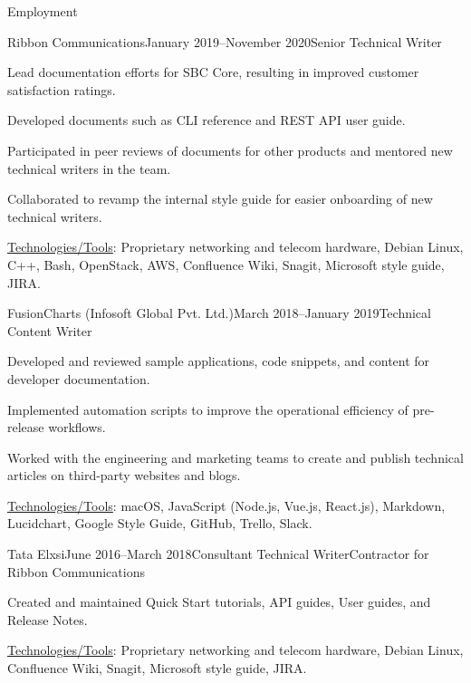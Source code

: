 \documentclass{resume} %
\begin{document}
\begin{rSection}{Employment}
\vspace{1cm}

\begin{rSubsection}{Ribbon Communications}{January 2019–November 2020}{Senior Technical Writer}{}
\item Lead documentation efforts for SBC Core, resulting in improved customer satisfaction ratings.
\item Developed documents such as CLI reference and REST API user guide.
\item Participated in peer reviews of documents for other products and mentored new technical writers in the team.
\item Collaborated to revamp the internal style guide for easier onboarding of new technical writers.
\item \underline{Technologies/Tools}: Proprietary networking and telecom hardware, Debian Linux, C++, Bash, OpenStack, AWS, Confluence Wiki, Snagit, Microsoft style guide, JIRA.
\end{rSubsection}


\begin{rSubsection}{FusionCharts (Infosoft Global Pvt. Ltd.)}{March 2018–January 2019}{Technical Content Writer}{}
\item Developed and reviewed sample applications, code snippets, and content for developer documentation.
\item Implemented automation scripts to improve the operational efficiency of pre-release workflows.
\item Worked with the engineering and marketing teams to create and publish technical articles on third-party websites and blogs.
\item \underline{Technologies/Tools}: macOS, JavaScript (Node.js, Vue.js, React.js), Markdown, Lucidchart, Google Style Guide, GitHub, Trello, Slack.
\end{rSubsection}


\begin{rSubsection}{Tata Elxsi}{June 2016–March 2018}{Consultant Technical Writer}{Contractor for Ribbon Communications}
\item Created and maintained Quick Start tutorials, API guides, User guides, and Release Notes.
\item \underline{Technologies/Tools}: Proprietary networking and telecom hardware, Debian Linux, Confluence Wiki, Snagit, Microsoft style guide, JIRA.
\end{rSubsection}


\end{rSection}
\end{document}
